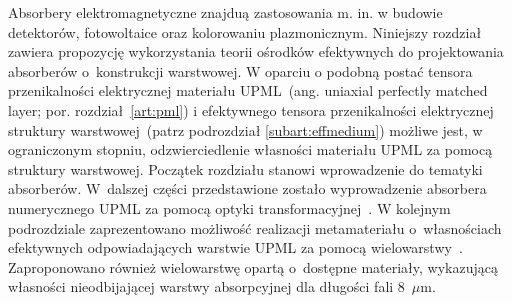 Absorbery elektromagnetyczne znajduą zastosowania m. in. w budowie detektorów, fotowoltaice oraz kolorowaniu plazmonicznym. Niniejszy rozdział zawiera propozycję wykorzystania teorii ośrodków efektywnych do projektowania absorberów o~konstrukcji warstwowej. W oparciu o podobną postać tensora przenikalności elektrycznej materiału UPML~(ang. uniaxial perfectly matched layer; por. rozdział~\ref{art:pml}) i efektywnego tensora przenikalności elektrycznej struktury warstwowej~(patrz podrozdział \ref{subart:effmedium}) możliwe jest, w ograniczonym stopniu, odzwierciedlenie własności materiału UPML za pomocą struktury warstwowej. Początek rozdziału stanowi wprowadzenie do tematyki absorberów. W~dalszej części przedstawione zostało wyprowadzenie absorbera numerycznego UPML za pomocą optyki transformacyjnej~\cite{pendry2012transformation}. W kolejnym podrozdziale zaprezentowano możliwość realizacji metamateriału o~własnościach efektywnych odpowiadających warstwie UPML za pomocą wielowarstwy~\cite{ania2015}. Zaproponowano również wielowarstwę opartą o~dostępne materiały, wykazującą własności nieodbijającej warstwy absorpcyjnej dla długości fali $8$~$\mu$m.


